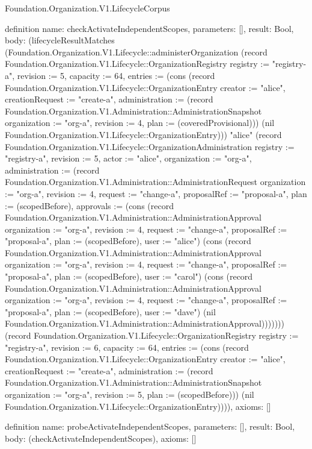 \begin{lexlean}{Foundation.Organization.V1.LifecycleCorpus}
\begin{semanticmodule}
definition{
  name: checkActivateIndependentScopes,
  parameters: [],
  result: Bool,
  body: (lifecycleResultMatches (Foundation.Organization.V1.Lifecycle::administerOrganization (record Foundation.Organization.V1.Lifecycle::OrganizationRegistry {registry := "registry-a", revision := 5, capacity := 64, entries := (cons (record Foundation.Organization.V1.Lifecycle::OrganizationEntry {creator := "alice", creationRequest := "create-a", administration := (record Foundation.Organization.V1.Administration::AdministrationSnapshot {organization := "org-a", revision := 4, plan := (coveredProvisional)})}) (nil Foundation.Organization.V1.Lifecycle::OrganizationEntry))}) "alice" (record Foundation.Organization.V1.Lifecycle::OrganizationAdministration {registry := "registry-a", revision := 5, actor := "alice", organization := "org-a", administration := (record Foundation.Organization.V1.Administration::AdministrationRequest {organization := "org-a", revision := 4, request := "change-a", proposalRef := "proposal-a", plan := (scopedBefore), approvals := (cons (record Foundation.Organization.V1.Administration::AdministrationApproval {organization := "org-a", revision := 4, request := "change-a", proposalRef := "proposal-a", plan := (scopedBefore), user := "alice"}) (cons (record Foundation.Organization.V1.Administration::AdministrationApproval {organization := "org-a", revision := 4, request := "change-a", proposalRef := "proposal-a", plan := (scopedBefore), user := "carol"}) (cons (record Foundation.Organization.V1.Administration::AdministrationApproval {organization := "org-a", revision := 4, request := "change-a", proposalRef := "proposal-a", plan := (scopedBefore), user := "dave"}) (nil Foundation.Organization.V1.Administration::AdministrationApproval))))})})) (record Foundation.Organization.V1.Lifecycle::OrganizationRegistry {registry := "registry-a", revision := 6, capacity := 64, entries := (cons (record Foundation.Organization.V1.Lifecycle::OrganizationEntry {creator := "alice", creationRequest := "create-a", administration := (record Foundation.Organization.V1.Administration::AdministrationSnapshot {organization := "org-a", revision := 5, plan := (scopedBefore)})}) (nil Foundation.Organization.V1.Lifecycle::OrganizationEntry))})),
  axioms: []
}

definition{
  name: probeActivateIndependentScopes,
  parameters: [],
  result: Bool,
  body: (checkActivateIndependentScopes),
  axioms: []
}


\end{semanticmodule}
\end{lexlean}
